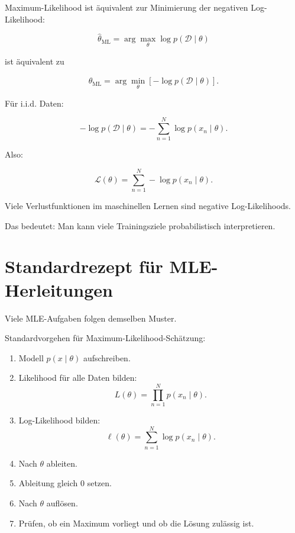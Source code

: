 Maximum-Likelihood ist äquivalent zur Minimierung der negativen Log-Likelihood:

\[
    \hat{\theta}_{\mathrm{ML}}
    =
    \arg\max_{\theta}
    \log p(\mathcal{D} \mid \theta)
\]

ist äquivalent zu

\[
    \hat{\theta}_{\mathrm{ML}}
    =
    \arg\min_{\theta}
    \left[
        -\log p(\mathcal{D} \mid \theta)
    \right].
\]

Für i.i.d. Daten:

\[
    -\log p(\mathcal{D} \mid \theta)
    =
    -\sum_{n=1}^{N}
    \log p(x_n \mid \theta).
\]

Also:

\[
    \mathcal{L}(\theta)
    =
    \sum_{n=1}^{N}
    -\log p(x_n \mid \theta).
\]

\begin{conceptbox}
Viele Verlustfunktionen im maschinellen Lernen sind negative Log-Likelihoods.

Das bedeutet:
Man kann viele Trainingsziele probabilistisch interpretieren.
\end{conceptbox}

\section{Standardrezept für MLE-Herleitungen}

Viele MLE-Aufgaben folgen demselben Muster.

\begin{examtipbox}
Standardvorgehen für Maximum-Likelihood-Schätzung:

\begin{enumerate}
    \item Modell \(p(x \mid \theta)\) aufschreiben.
    \item Likelihood für alle Daten bilden:
    \[
        L(\theta)
        =
        \prod_{n=1}^{N}
        p(x_n \mid \theta).
    \]
    \item Log-Likelihood bilden:
    \[
        \ell(\theta)
        =
        \sum_{n=1}^{N}
        \log p(x_n \mid \theta).
    \]
    \item Nach \(\theta\) ableiten.
    \item Ableitung gleich \(0\) setzen.
    \item Nach \(\theta\) auflösen.
    \item Prüfen, ob ein Maximum vorliegt und ob die Lösung zulässig ist.
\end{enumerate}
\end{examtipbox}

